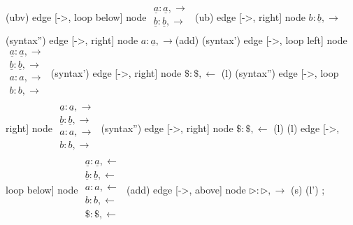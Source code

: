 \documentclass{article}
\newcommand{\la}{\leftarrow}
\newcommand{\ra}{\rightarrow}
\newcommand{\s}{\rhd}
\renewcommand{\u}{\underline}
\begin{document}
{        (ubv)
            edge [->, loop below] node {$\begin{array}{l}
                                            \u{a} : \u{a}, \ra\\
                                            \u{b} : \u{b}, \ra\\
                                        \end{array}$} (ub)
            edge [->, right] node {$b:\u{b}, \ra$}(syntax'')
            edge [->, right] node {$a:\u{a}, \ra$}(add)
        (syntax')
            edge [->, loop left] node {$\begin{array}{l}
                                            \u{a} : \u{a}, \ra\\
                                            \u{b} : \u{b}, \ra\\
                                            a : a, \ra\\
                                            b : b, \ra\\
                                        \end{array}$} (syntax')
            edge [->, right] node {$\$: \$, \la$} (l)
        (syntax'')
            edge [->, loop right] node {$\begin{array}{l}
                                            \u{a} : \u{a}, \ra\\
                                            \u{b} : \u{b}, \ra\\
                                            a : a, \ra\\
                                            b : b, \ra\\
                                        \end{array}$} (syntax'')
            edge [->, right] node {$\$: \$, \la$} (l)
        (l)
            edge [->, loop below] node {$\begin{array}{l}
                                            \u{a} : \u{a}, \la\\
                                            \u{b} : \u{b}, \la\\
                                            a : a, \la\\
                                            b : b, \la\\
                                            \$ : \$, \la\\
                                        \end{array}$} (add)
            edge [->, above] node {$\s : \s, \ra$} (s)
        (l')
    ;}\\
\end{document}
